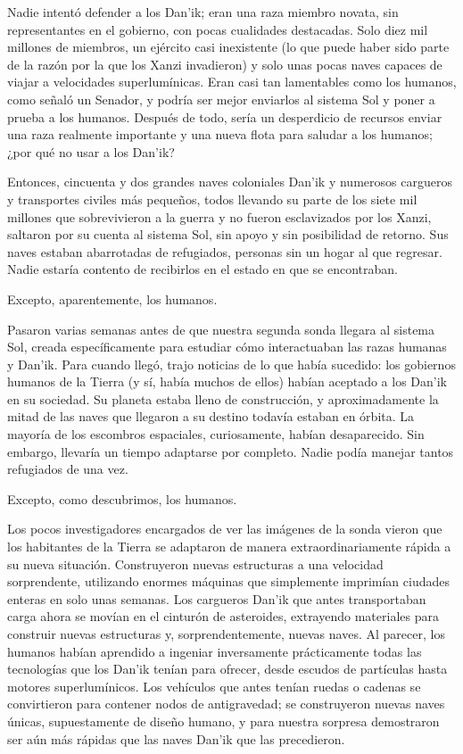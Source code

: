 \documentclass[spanish,12pt,a4paper, oneside]{book}
\begin{document}
    Nadie intentó defender a los Dan'ik; eran una raza miembro novata, sin representantes en el gobierno, con pocas cualidades destacadas. Solo diez mil millones de miembros, un ejército casi inexistente (lo que puede haber sido parte de la razón por la que los Xanzi invadieron) y solo unas pocas naves capaces de viajar a velocidades superlumínicas. Eran casi tan lamentables como los humanos, como señaló un Senador, y podría ser mejor enviarlos al sistema Sol y poner a prueba a los humanos. Después de todo, sería un desperdicio de recursos enviar una raza realmente importante y una nueva flota para saludar a los humanos; ¿por qué no usar a los Dan'ik?

    Entonces, cincuenta y dos grandes naves coloniales Dan'ik y numerosos cargueros y transportes civiles más pequeños, todos llevando su parte de los siete mil millones que sobrevivieron a la guerra y no fueron esclavizados por los Xanzi, saltaron por su cuenta al sistema Sol, sin apoyo y sin posibilidad de retorno. Sus naves estaban abarrotadas de refugiados, personas sin un hogar al que regresar. Nadie estaría contento de recibirlos en el estado en que se encontraban.

    Excepto, aparentemente, los humanos.

    Pasaron varias semanas antes de que nuestra segunda sonda llegara al sistema Sol, creada específicamente para estudiar cómo interactuaban las razas humanas y Dan'ik. Para cuando llegó, trajo noticias de lo que había sucedido: los gobiernos humanos de la Tierra (y sí, había muchos de ellos) habían aceptado a los Dan'ik en su sociedad. Su planeta estaba lleno de construcción, y aproximadamente la mitad de las naves que llegaron a su destino todavía estaban en órbita. La mayoría de los escombros espaciales, curiosamente, habían desaparecido. Sin embargo, llevaría un tiempo adaptarse por completo. Nadie podía manejar tantos refugiados de una vez.

    Excepto, como descubrimos, los humanos.

    Los pocos investigadores encargados de ver las imágenes de la sonda vieron que los habitantes de la Tierra se adaptaron de manera extraordinariamente rápida a su nueva situación. Construyeron nuevas estructuras a una velocidad sorprendente, utilizando enormes máquinas que simplemente imprimían ciudades enteras en solo unas semanas. Los cargueros Dan'ik que antes transportaban carga ahora se movían en el cinturón de asteroides, extrayendo materiales para construir nuevas estructuras y, sorprendentemente, nuevas naves. Al parecer, los humanos habían aprendido a ingeniar inversamente prácticamente todas las tecnologías que los Dan'ik tenían para ofrecer, desde escudos de partículas hasta motores superlumínicos. Los vehículos que antes tenían ruedas o cadenas se convirtieron para contener nodos de antigravedad; se construyeron nuevas naves únicas, supuestamente de diseño humano, y para nuestra sorpresa demostraron ser aún más rápidas que las naves Dan'ik que las precedieron.
\end{document}
